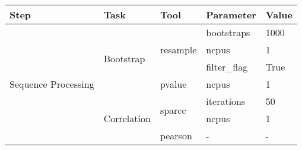 \begin{table}[h]
\centering
\small
\begin{tabular}{lllll}
\hline
\textbf{Step}                             & \textbf{Task}                                            & \textbf{Tool}                          & \textbf{Parameter}                     & \textbf{Value}                                                                                           \\ \hline
\multirow{17}{*}{Sequence Processing}     & \multirow{4}{*}{Bootstrap}                               & \multirow{3}{*}{resample}              & bootstraps                             & 1000                                                                                                     \\
                                          &                                                          &                                        & ncpus                                  & 1                                                                                                        \\
                                          &                                                          &                                        & filter\_flag                           & True                                                                                                     \\
                                          &                                                          & pvalue                                 & ncpus                                  & 1                                                                                                        \\ \cline{2-5}
                                          & \multirow{12}{*}{Correlation}                            & \multirow{2}{*}{sparcc}                & iterations                             & 50                                                                                                       \\
                                          &                                                          &                                        & ncpus                                  & 1                                                                                                        \\
                                          &                                                          & pearson                                & -                                      & -                                                                                                        \\

\end{tabular}
\end{table}
